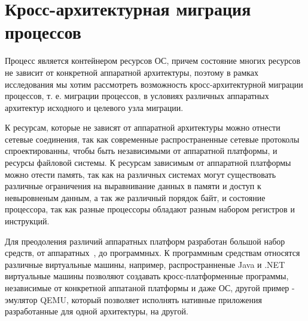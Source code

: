 \section{Кросс-архитектурная миграция процессов}

Процесс является контейнером ресурсов ОС, причем состояние многих ресурсов не зависит от конкретной аппаратной архитектуры, поэтому в рамках исследования мы хотим рассмотреть возможность кросс-архитектурной миграции процессов, т. е. миграции процессов, в условиях различных аппаратных архитектур исходного и целевого узла миграции.

К ресурсам, которые не зависят от аппаратной архитектуры можно отнести сетевые соединения, так как современные распространенные сетевые протоколы спроектированны, чтобы быть независимыми от аппаратной платформы, и ресурсы файловой системы. К ресурсам зависимым от аппаратной платформы можно отести память, так как на различных системах могут существовать различные ограничения на выравнивание данных в памяти и доступ к невыровненым данным, а так же различный порядок байт, и состояние процессора, так как разные процессоры обладают разным набором регистров и инструкций.

Для преодоления различий аппаратных платформ разработан большой набор средств, от аппаратных~\cite{X86ARMBHI,ISAVIRT}, до программных. К программным средствам относятся различные виртуальные машины, например, распространненые Java и .NET виртуальные машины позволяют создавать кросс-платформенные программы, независимые от конкретной аппатаной платформы и даже ОС, другой пример - эмулятор QEMU, который позволяет исполнять нативные приложения разработанные для одной архитектуры, на другой.
